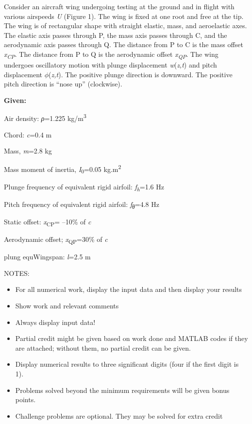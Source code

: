 \documentclass[11pt]{article}
\begin{document}
\newpage

Consider an aircraft wing undergoing testing at the ground and in flight
with various airspeeds \emph{U} (Figure 1). The wing is fixed at one
root and free at the tip. The wing is of rectangular shape with straight
elastic, mass, and aeroelastic axes. The elastic axis passes through P,
the mass axis passes through C, and the aerodynamic axis passes through
Q. The distance from P to C is the mass offset
\emph{x\textsubscript{CP}}. The distance from P to Q is the aerodynamic
offset \emph{x\textsubscript{QP}}. The wing undergoes oscillatory motion
with plunge displacement \emph{w}(\emph{z,t}) and pitch displacement
\emph{\ensuremath{\phi}}(\emph{z,t}). The positive plunge direction is downward. The
positive pitch direction is ``nose up'' (clockwise).

\bigskip
\textbf{Given:}

Air density: \emph{ρ}=1.225 kg/m\textsuperscript{3}

Chord: \emph{c}=0.4 m

Mass, \emph{m}=2.8 kg

Mass moment of inertia, \emph{I}\textsubscript{0}=0.05
kg.m\textsuperscript{2}

Plunge frequency of equivalent rigid airfoil:
\emph{f\textsubscript{h}}=1.6 Hz

Pitch frequency of equivalent rigid airfoil:
\emph{f\textsubscript{θ}}=4.8 Hz

Static offset: \emph{x}\textsubscript{CP}= --10\% of \emph{c}

Aerodynamic offset; \emph{x}\textsubscript{QP}=30\% of \emph{c}

plung equWingspan: \emph{l}=2.5 m

NOTES:

\begin{itemize}
\item
  For all numerical work, display the input data and then display your
  results
\item
  Show work and relevant comments
\item
  Always display input data!
\item
  Partial credit might be given based on work done and MATLAB codes if
  they are attached; without them, no partial credit can be given.
\item
  Display numerical results to three significant digits (four if the
  first digit is 1).
\item
  Problems solved beyond the minimum requirements will be given bonus
  points.
\item
  Challenge problems are optional. They may be solved for extra credit
\end{itemize}
\end{document}
